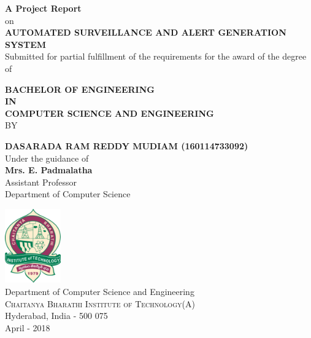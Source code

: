 \begin{titlepage}

\begin{center}

\textup{\small {\bf A Project Report} \\ on}\\[0.2in]

\Large \textbf {AUTOMATED SURVEILLANCE AND ALERT GENERATION SYSTEM}\\[0.5in]

       \small Submitted for partial fulfillment of the requirements for the award of the degree of
        \vspace{.2in}

       {\bf BACHELOR OF ENGINEERING \\IN\\ COMPUTER SCIENCE AND ENGINEERING}\\[0.2in]

\normalsize BY \\
\vspace{.1in}

\footnotesize \textbf{DASARADA RAM REDDY MUDIAM (160114733092)}\\


\vspace{.1in}
Under the guidance of\\
{\textbf{Mrs. E. Padmalatha}}\\
Assistant Professor\\
Department of Computer Science\\[0.2in]
\vfill

\includegraphics[width=0.18\textwidth]{./cbit-logo}\\[0.1in]
\Large{Department of Computer Science and Engineering}\\
\normalsize
\textsc{Chaitanya Bharathi Institute of Technology(A)}\\
Hyderabad, India - 500 075 \\
April - 2018

\end{center}

\end{titlepage}